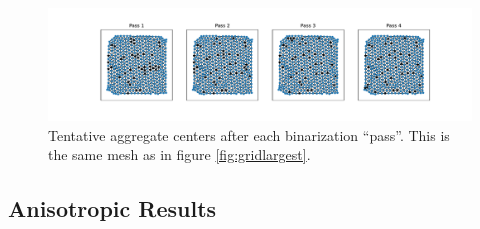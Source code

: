 \documentclass{article}
\begin{document}
\begin{figure}[h]
  \centering
  \includegraphics[width=\textwidth, trim=120 0 100 0, clip]{grid_largest_agg_pass.pdf}
  \caption{Tentative aggregate centers after each binarization ``pass''.  This is the same mesh as in figure \ref{fig:gridlargest}.}
\end{figure}

\FloatBarrier
\subsection{Anisotropic Results}
\end{document}
